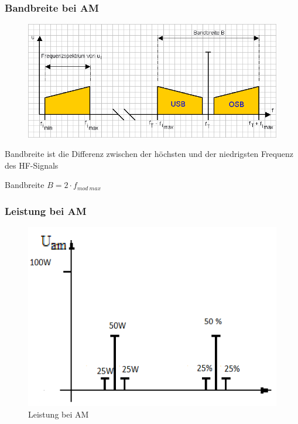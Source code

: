 \begin{frame}
  \frametitle{Bandbreite bei AM}
  \begin{center}
    \begin{figure}
      \includegraphics[width=.8\textwidth,height=.4\textheight,keepaspectratio]{e14/Bandbreite.png}
    \end{figure}
  \end{center}
  Bandbreite ist die Differenz zwischen der höchsten und der niedrigsten Frequenz des HF-Signals
  \begin{block}{Bandbreite}
    {$B = 2 \cdot f_{mod~max}$}
  \end{block}
\end{frame}

\begin{frame}
  \frametitle{Leistung bei AM}
  \begin{figure}
    \includegraphics[width=\textwidth,height=.75\textheight,keepaspectratio]{e14/AMP.png}
    \caption{Leistung bei AM}
  \end{figure}
\end{frame}

